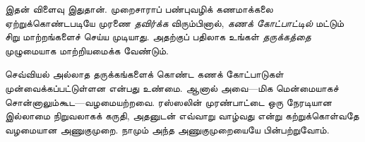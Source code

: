 \documentclass[../../../include/open-logic-section]{subfiles}
\begin{document}
இதன் விளைவு இதுதான். முறைசாராப் பண்புவழிக் கணமாக்கலை ஏற்றுக்கொண்டபடியே
முரணை \emph{தவிர்க்க} விரும்பினால், \emph{கணக் கோட்பாட்டில்} மட்டும் சிறு
மாற்றங்களைச் செய்ய முடியாது. அதற்குப் பதிலாக உங்கள் \emph{தருக்கத்தை}
முழுமையாக மாற்றியமைக்க வேண்டும்.

செவ்வியல் அல்லாத தருக்கங்களைக் கொண்ட கணக் கோட்பாடுகள் முன்வைக்கப்பட்டுள்ளன
என்பது உண்மை. ஆனால் அவை---மிக மென்மையாகச் சொன்னாலும்கூட---வழமையற்றவை.
ரஸ்ஸலின் முரண்பாட்டை ஒரு நேரடியான இல்லாமை நிறுவலாகக் கருதி, அதனுடன்
எவ்வாறு வாழ்வது என்று கற்றுக்கொள்வதே வழமையான அணுகுமுறை. நாமும் அந்த
அணுகுமுறையையே பின்பற்றுவோம்.
\end{document}
